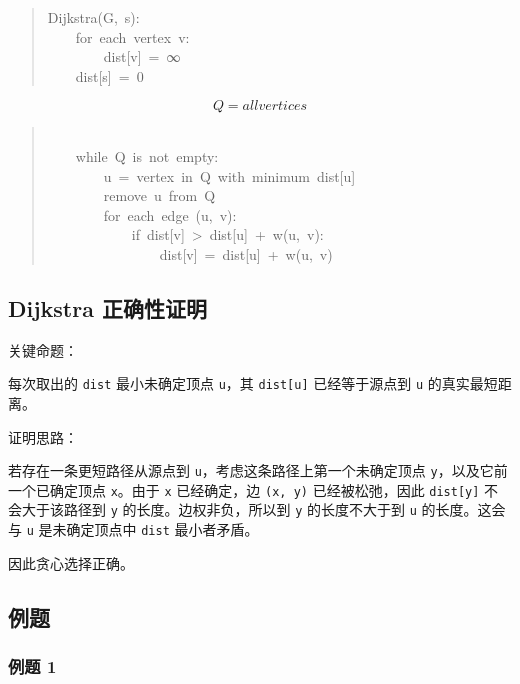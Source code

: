 \documentclass[UTF8,zihao=-4]{ctexart}
\begin{document}
\begin{quote}
\small\ttfamily\raggedright
\relax Dijkstra(G,\ s):\\
\relax \ \ \ \ for\ each\ vertex\ v:\\
\relax \ \ \ \ \ \ \ \ dist[v]\ =\ ∞\\
\relax \ \ \ \ dist[s]\ =\ 0\\
\end{quote}
\[Q = all vertices\]
\begin{quote}
\small\ttfamily\raggedright
\mbox{}\\
\relax \ \ \ \ while\ Q\ is\ not\ empty:\\
\relax \ \ \ \ \ \ \ \ u\ =\ vertex\ in\ Q\ with\ minimum\ dist[u]\\
\relax \ \ \ \ \ \ \ \ remove\ u\ from\ Q\\
\relax \ \ \ \ \ \ \ \ for\ each\ edge\ (u,\ v):\\
\relax \ \ \ \ \ \ \ \ \ \ \ \ if\ dist[v]\ >\ dist[u]\ +\ w(u,\ v):\\
\relax \ \ \ \ \ \ \ \ \ \ \ \ \ \ \ \ dist[v]\ =\ dist[u]\ +\ w(u,\ v)\\
\end{quote}

\subsection*{Dijkstra 正确性证明}

关键命题：

每次取出的 \texttt{dist} 最小未确定顶点 \texttt{u}，其 \texttt{dist[u]} 已经等于源点到 \texttt{u} 的真实最短距离。

证明思路：

若存在一条更短路径从源点到 \texttt{u}，考虑这条路径上第一个未确定顶点 \texttt{y}，以及它前一个已确定顶点 \texttt{x}。由于 \texttt{x} 已经确定，边 \texttt{(x, y)} 已经被松弛，因此 \texttt{dist[y]} 不会大于该路径到 \texttt{y} 的长度。边权非负，所以到 \texttt{y} 的长度不大于到 \texttt{u} 的长度。这会与 \texttt{u} 是未确定顶点中 \texttt{dist} 最小者矛盾。

因此贪心选择正确。

\subsection*{例题}

\subsubsection*{例题 1}
\end{document}
